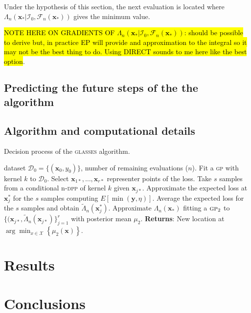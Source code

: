 \documentclass[twoside]{article}
\newcommand{\I}{\mathcal{I}}
\newcommand{\bx}{\textbf{x}}
\newcommand{\by}{\textbf{y}}
\newcommand{\future}{\mathcal{F}}
\newcommand{\acr}[1]{\textsc{#1}\xspace}
\newcommand{\gp}{\acr{gp}}
\newcommand{\dpp}{\acr{dpp}}
\newcommand{\us}{\acr{glasses}}
\begin{document}
Under the hypothesis of this section, the next evaluation is located where $\Lambda_n(\bx_*|\I_0, \future_{n}(\bx_*) )$ gives the minimum value. 

\hl{NOTE HERE ON GRADIENTS OF $\Lambda_n(\bx_*|\I_0, \future_{n}(\bx_*) )$: should be possible to derive but, in practice EP will provide and approximation to the integral so it may not be the best thing to do. Using DIRECT sounds to me here like the best option}.

\subsection{Predicting the future steps of the the algorithm}


\subsection{Algorithm and computational details}


\begin{algorithm*}[t!]
   \caption{Decision process of the \us algorithm.}
   \label{alg:glasses}
\begin{algorithmic}
    dataset $\mathcal{D}_{0} = \{(\textbf{x}_0, y_0)\}$, number of remaining evaluations ($n$).
   \STATE Fit a \gp with kernel $k$ to $\mathcal{D}_{0}$.
   \STATE Select $\bx_{1*},\dots,\bx_{r*}$ representer points of the loss.
   \STATE Take $s$ samples from a conditional n-\dpp of kernel $k$ given $\bx_{j*}$.
   \STATE Approximate the expected loss at $\bx_j^*$ for the $s$ samples computing $E [\min (\by,\eta)]$.
  \STATE Average the expected loss for the $s$ samples and obtain $\tilde{\Lambda}_n(\bx_j^*)$.
   \ENDFOR
\STATE Approximate $\Lambda_n(\bx_*)$ fitting a $\gp_2$  to $\{(\bx_{j*}, \tilde{\Lambda}_n(\bx_{j*})\}_{j=1}^r$ with posterior mean $\mu_2$.
   \STATE \textbf{Returns}: New location at $\arg \min_{x \in \mathcal{X}} \left\{\mu_2(\bx)\right\}$.  
\end{algorithmic}
\end{algorithm*}

\section{Results}


\section{Conclusions}
\end{document}
